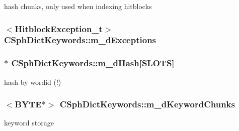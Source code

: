 hash chunks, only used when indexing hitblocks 

\hypertarget{classCSphDictKeywords_a9972e58752289ba840cee41455c7131e}{
\subsubsection[{m\-\_\-d\-Exceptions}]{$<${\bf Hitblock\-Exception\-\_\-t}$>$ C\-Sph\-Dict\-Keywords\-::m\-\_\-d\-Exceptions\hspace{0.3cm}{\ttfamily [private]}}}\label{classCSphDictKeywords_a9972e58752289ba840cee41455c7131e}
\hypertarget{classCSphDictKeywords_a011ad3a98db6ae7a6f123a1bd46e6edc}{
\subsubsection[{m\-\_\-d\-Hash}]{$\ast$ C\-Sph\-Dict\-Keywords\-::m\-\_\-d\-Hash\mbox{[}{\bf S\-L\-O\-T\-S}\mbox{]}\hspace{0.3cm}{\ttfamily [private]}}}\label{classCSphDictKeywords_a011ad3a98db6ae7a6f123a1bd46e6edc}


hash by wordid (!) 

\hypertarget{classCSphDictKeywords_a2f573557f042bc7bfc069b21b2c9fa1c}{
\subsubsection[{m\-\_\-d\-Keyword\-Chunks}]{$<${\bf B\-Y\-T\-E}$\ast$$>$ C\-Sph\-Dict\-Keywords\-::m\-\_\-d\-Keyword\-Chunks\hspace{0.3cm}{\ttfamily [private]}}}\label{classCSphDictKeywords_a2f573557f042bc7bfc069b21b2c9fa1c}


keyword storage 

